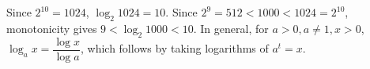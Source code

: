 Since $2^{10}=1024$, $\boxed{\log_2 1024=10}$. Since $2^9=512<1000<1024=2^{10}$, monotonicity gives $\boxed{9<\log_2 1000<10}$. In general, for $a>0,a\ne1,x>0$, $\log_a x=\dfrac{\log x}{\log a}$, which follows by taking logarithms of $a^t=x$.

